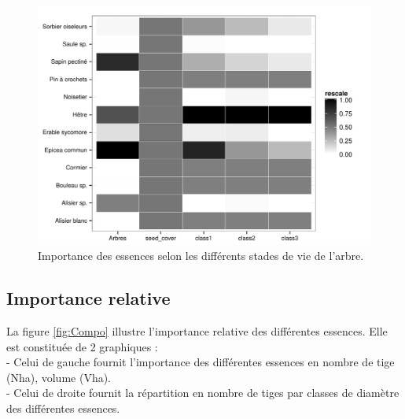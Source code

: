 \documentclass[a4paper]{book}\usepackage[]{graphicx}\usepackage[]{color}
\makeatletter
\def\maxwidth{ %
  \ifdim\Gin@nat@width>\linewidth
    \linewidth
  \else
    \Gin@nat@width
  \fi
}
\newenvironment{knitrout}{}{} %
\makeatother
\begin{document}
\begin{knitrout}
\color{fgcolor}\begin{figure}[]


{\centering \includegraphics[width=\maxwidth]{Figures/CompoGlobal-1} 

}

\caption[Importance des essences selon les différents stades de vie de l'arbre]{Importance des essences selon les différents stades de vie de l'arbre.\label{fig:CompoGlobal}}
\end{figure}


\end{knitrout}


\subsection{Importance relative}
La figure \ref{fig:Compo} illustre l'importance relative des différentes essences. Elle est constituée de 2 graphiques : \\
- Celui de gauche fournit l'importance des différentes essences en nombre de tige (Nha), volume (Vha). \\
- Celui de droite fournit la répartition en nombre de tiges par classes de diamètre des différentes essences.
\end{document}
